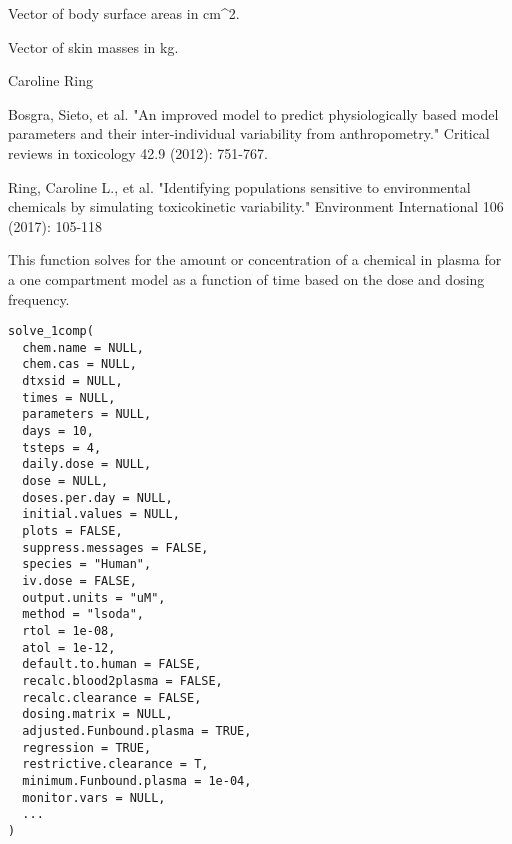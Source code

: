 \documentclass[a4paper]{book}
\begin{document}
%
\begin{Arguments}
\begin{ldescription}
\item[\code{BSA}] Vector of body surface areas in cm\textasciicircum{}2.
\end{ldescription}
\end{Arguments}
%
\begin{Value}
Vector of skin masses in kg.
\end{Value}
%
\begin{Author}\relax
Caroline Ring
\end{Author}
%
\begin{References}\relax
Bosgra, Sieto, et al. "An improved model to predict 
physiologically based model parameters and their inter-individual variability 
from anthropometry." Critical reviews in toxicology 42.9 (2012): 751-767.

Ring, Caroline L., et al. "Identifying populations sensitive to
environmental chemicals by simulating toxicokinetic variability."
Environment International 106 (2017): 105-118
\end{References}
\graphicspath{{"C:/Users/jwambaug/git/httk/httk/man/figures/"}}
%
\begin{Description}\relax
This function solves for the amount or concentration of a chemical in plasma
for a one compartment model as a function of time based on the dose and
dosing frequency.
\end{Description}
%
\begin{Usage}
\begin{verbatim}
solve_1comp(
  chem.name = NULL,
  chem.cas = NULL,
  dtxsid = NULL,
  times = NULL,
  parameters = NULL,
  days = 10,
  tsteps = 4,
  daily.dose = NULL,
  dose = NULL,
  doses.per.day = NULL,
  initial.values = NULL,
  plots = FALSE,
  suppress.messages = FALSE,
  species = "Human",
  iv.dose = FALSE,
  output.units = "uM",
  method = "lsoda",
  rtol = 1e-08,
  atol = 1e-12,
  default.to.human = FALSE,
  recalc.blood2plasma = FALSE,
  recalc.clearance = FALSE,
  dosing.matrix = NULL,
  adjusted.Funbound.plasma = TRUE,
  regression = TRUE,
  restrictive.clearance = T,
  minimum.Funbound.plasma = 1e-04,
  monitor.vars = NULL,
  ...
)
\end{verbatim}
\end{Usage}
%
\end{document}
